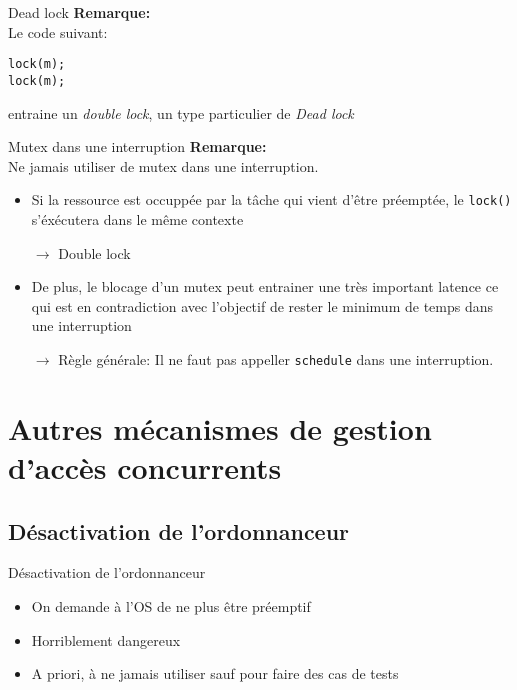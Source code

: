 \begin{frame}[fragile]{Dead lock}
  \textbf{Remarque:} \\
  Le code suivant:
  \begin{lstlisting}
lock(m);
lock(m);
  \end{lstlisting}
  entraine un  \emph{double lock},  un type particulier  de \emph{Dead
    lock}
\end{frame}

\begin{frame}[fragile]{Mutex dans une interruption}
  \textbf{Remarque:} \\
  Ne jamais utiliser de mutex dans une interruption.
  \begin{itemize}
  \item Si  la ressource  est occuppée par  la tâche qui  vient d'être
    préemptée, le \texttt{lock()} s'éxécutera dans le même contexte
  \item[$\rightarrow$] Double lock
  \item De plus,  le blocage d'un mutex peut entrainer
    une  très  important latence  ce  qui  est  en contradiction  avec
    l'objectif de rester le minimum de temps dans une interruption
  \item[$\rightarrow$]  Règle  générale:   Il  ne  faut  pas  appeller
    \texttt{schedule} dans une interruption.
  \end{itemize}
\end{frame}

\section{Autres mécanismes de gestion d'accès concurrents}


\subsection{Désactivation de l'ordonnanceur}

\begin{frame}{Désactivation de l'ordonnanceur}
  \begin{itemize}
  \item On demande à l'OS de ne plus être préemptif
  \item Horriblement dangereux
  \item A  priori, à  ne jamais  utiliser sauf pour  faire des  cas de
    tests
  \end{itemize}
\end{frame}

